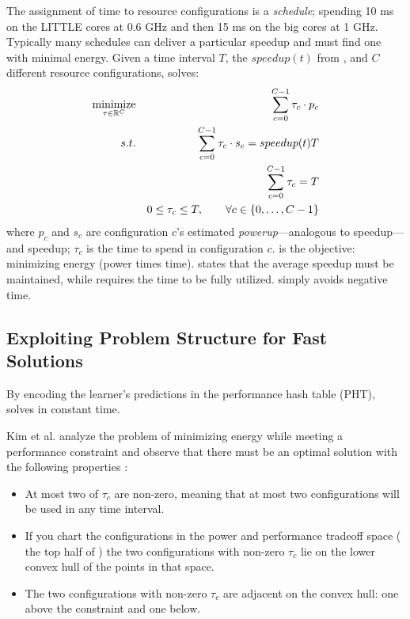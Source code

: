 The assignment of time to resource configurations is a
\emph{schedule}; \eg{} spending 10 ms on the LITTLE cores at 0.6 GHz
and then 15 ms on the big cores at 1 GHz. Typically many schedules can
deliver a particular speedup and \SYSTEM{} must find one with minimal
energy.  Given a time interval $T$, the $speedup(t)$ from
, and $C$ different resource configurations,
\SYSTEM{} solves:
\begin{eqnarray}
  \minimize_{\mathbf{\tau} \in \R^{C}} && \sum_{c=0}^{C-1} \tau_c \cdot p_c \label{eqn:power}  \\
  \st %
  && \sum_{c=0}^{C-1} \tau_c \cdot s_c =  speedup(t)T \label{eqn:work} \\
  && \sum_{c=0}^{C-1} \tau_c =  T \label{eqn:deadline} \\
  && 0 \le \tau_c \le T, \qquad \forall c \in \{0,\ldots,C-1\} \label{eqn:time}
\end{eqnarray}
where $p_c$ and $s_c$ are configuration $c$'s estimated
\emph{powerup}---analogous to speedup---and speedup; $\tau_c$ is the
time to spend in configuration $c$.   is the objective:
minimizing energy (power times time).   states that the
average speedup must be maintained, while  requires
the time to be fully utilized.   simply avoids negative
time.

\subsection{Exploiting Problem Structure for Fast Solutions}
By encoding the learner's predictions in the performance hash table
(PHT), \SYSTEM{} solves  in constant time.

Kim et al. analyze the problem of minimizing energy while meeting a
performance constraint and observe that there must be an optimal
solution with the following properties \cite{kim-cpsna}:
\begin{itemize}[leftmargin=1em]
\item At most two of $\tau_c$ are non-zero, meaning that at most two
  configurations will be used in any time interval.
\item If you chart the configurations in the power and performance
  tradeoff space (\eg{} the top half of ) the two
  configurations with non-zero $\tau_c$ lie on the lower convex hull
  of the points in that space.
\item The two configurations with non-zero $\tau_c$ are adjacent on
  the convex hull: one above the constraint and one below.
\end{itemize}


